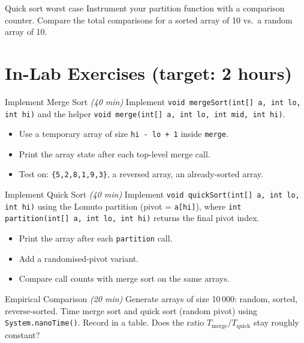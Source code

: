 \documentclass[11pt]{article}
\begin{document}
\begin{tryit}{Quick sort worst case}
Instrument your partition function with a comparison counter.
Compare the total comparisons for a sorted array of 10 vs.\ a random array of 10.
\end{tryit}

\section*{In-Lab Exercises (target: 2 hours)}

\begin{labexercise}{Implement Merge Sort \hfill {\small \itshape (40 min)}}
Implement \texttt{void mergeSort(int[] a, int lo, int hi)} and the helper
\texttt{void merge(int[] a, int lo, int mid, int hi)}.
\begin{itemize}[leftmargin=*,nosep]
  \item Use a temporary array of size \texttt{hi - lo + 1} inside \texttt{merge}.
  \item Print the array state after each top-level merge call.
  \item Test on: \texttt{\{5,2,8,1,9,3\}}, a reversed array, an already-sorted array.
\end{itemize}
\end{labexercise}

\begin{labexercise}{Implement Quick Sort \hfill {\small \itshape (40 min)}}
Implement \texttt{void quickSort(int[] a, int lo, int hi)} using the Lomuto partition
(pivot = \texttt{a[hi]}), where \texttt{int partition(int[] a, int lo, int hi)} returns
the final pivot index.
\begin{itemize}[leftmargin=*,nosep]
  \item Print the array after each \texttt{partition} call.
  \item Add a randomised-pivot variant.
  \item Compare call counts with merge sort on the same arrays.
\end{itemize}
\end{labexercise}

\begin{labexercise}{Empirical Comparison \hfill {\small \itshape (20 min)}}
Generate arrays of size 10\,000: random, sorted, reverse-sorted.
Time merge sort and quick sort (random pivot) using \texttt{System.nanoTime()}.
Record in a table. Does the ratio $T_{\text{merge}}/T_{\text{quick}}$ stay roughly constant?
\end{labexercise}
\end{document}
